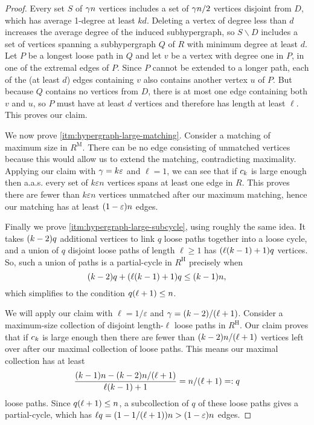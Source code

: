 \documentclass[11pt,english]{article}
\theoremstyle{plain}
\theoremstyle{definition}
\theoremstyle{definition}
\theoremstyle{plain}
\theoremstyle{plain}
\theoremstyle{plain}
\theoremstyle{plain}
\theoremstyle{remark}
\theoremstyle{remark}
\let\originalleft\left
\let\originalright\right
\renewcommand{\left}{\mathopen{}\mathclose\bgroup\originalleft}
\renewcommand{\right}{\aftergroup\egroup\originalright}
\begin{document}
\begin{proof}
Every set $S$ of $\gamma n$ vertices includes a set of $\gamma n/2$
vertices disjoint from $D$, which has average 1-degree at least $kd$.
Deleting a vertex of degree less than $d$ increases the average degree
of the induced subhypergraph, so $S\backslash D$ includes a set of
vertices spanning a subhypergraph $Q$ of $R$ with minimum degree
at least $d$. Let $P$ be a longest loose path in $Q$ and let $v$
be a vertex with degree one in $P$, in one of the extremal edges of $P$. Since $P$ cannot
be extended to a longer path, each of the (at least $d$) edges containing
$v$ also contains another vertex $u$ of $P$. But because $Q$ contains
no vertices from $D$, there is at most
one edge containing both $v$ and $u$, so $P$ must have at least
$d$ vertices and therefore has length at least $\ell$. This proves
our claim.

We now prove \ref{itm:hypergraph-large-matching}. Consider a matching of maximum size in $R^{\mathrm{M}}$.
There can be no edge consisting of unmatched vertices because this would
allow us to extend the matching, contradicting maximality. Applying
our claim with $\gamma=k\varepsilon$ and $\ell=1$, we can see that
if $c_{k}$ is large enough then
a.a.s.{} every set of $k\varepsilon n$ vertices spans at least one
edge in $R$. This proves there are fewer than $k\varepsilon n$
vertices unmatched after our maximum matching, hence our matching
has at least $\left(1-\varepsilon\right)n$ edges.

Finally we prove \ref{itm:hypergraph-large-subcycle}, using roughly the same idea. It takes $\left(k-2\right)q$ additional
vertices to link $q$ loose paths together into a loose cycle, and
a union of $q$ disjoint loose paths of length $\ell\ge1$ has $\left(\ell\left(k-1\right)+1\right)q$
vertices. So, such a union of paths is a partial-cycle in $R^{\mathrm{H}}$
precisely when 
\[
\left(k-2\right)q+\left(\ell\left(k-1\right)+1\right)q\le\left(k-1\right)n,
\]
which simplifies to the condition $q\left(\ell+1\right) \leq n$.

We will apply our claim with $\ell=1/\varepsilon$ and $\patheps=\left(k-2\right)/\left(\ell+1\right)$. Consider a maximum-size collection of disjoint length-$\ell$ loose paths in $R^{\mathrm{H}}$. Our claim proves that if $c_{k}$ is large enough then there are fewer than $\left(k-2\right)n/\left(\ell+1\right)$ vertices left over after our maximal collection of loose paths. This means our maximal collection has at least
\[
\frac{\left(k-1\right)n-\left(k-2\right)n/\left(\ell+1\right)}{\ell\left(k-1\right)+1}= n/\left(\ell+1\right)=:q
\]
loose paths. Since $q\left(\ell+1\right) \leq n$, a subcollection of $q$ of these loose paths gives a partial-cycle, which has $\ell q=\left(1-1/\left(\ell+1\right)\right)n>\left(1-\varepsilon\right)n$ edges.
\end{proof}
\end{document}
